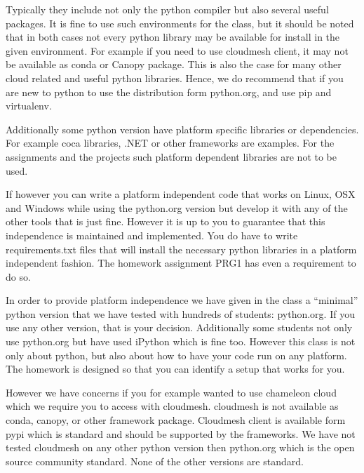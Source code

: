 Typically they include not only the python compiler but also several
useful packages. It is fine to use such environments for the class,
but it should be noted that in both cases not every python library may
be available for install in the given environment. For example if you
need to use cloudmesh client, it may not be available as conda or
Canopy package. This is also the case for many other cloud related and
useful python libraries. Hence, we do recommend that if you are new to
python to use the distribution form python.org, and use pip and
virtualenv.

Additionally some python version have platform specific libraries or
dependencies. For example coca libraries, .NET or other frameworks are
examples. For the assignments and the projects such platform dependent
libraries are not to be used.

If however you can write a platform independent code that works on
Linux, OSX and Windows while using the python.org version but develop
it with any of the other tools that is just fine. However it is up to
you to guarantee that this independence is maintained and
implemented. You do have to write requirements.txt files that will
install the necessary python libraries in a platform independent
fashion. The homework assignment PRG1 has even a requirement to do so.

In order to provide platform independence we have given in the class a
``minimal'' python version that we have tested with hundreds of
students: python.org. If you use any other version, that is your
decision. Additionally some students not only use python.org but have
used iPython which is fine too. However this class is not only about
python, but also about how to have your code run on any platform. The
homework is designed so that you can identify a setup that works for
you.

However we have concerns if you for example wanted to use chameleon
cloud which we require you to access with cloudmesh. cloudmesh is not
available as conda, canopy, or other framework package. Cloudmesh
client is available form pypi which is standard and should be
supported by the frameworks. We have not tested cloudmesh on any other
python version then python.org which is the open source community
standard. None of the other versions are standard.

